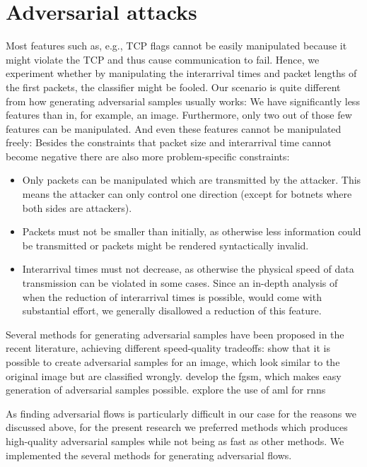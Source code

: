 \documentclass[conference]{IEEEtran}
\begin{document}
\section{Adversarial attacks}
\label{sec:adv}

Most features such as, e.g., TCP flags cannot be easily manipulated because it might violate the TCP and thus cause communication to fail. Hence, we experiment whether by manipulating the interarrival times and packet lengths of the first packets, the classifier might be fooled. Our scenario is quite different from how generating adversarial samples usually works: We have significantly less features than in, for example, an image. Furthermore, only two out of those few features can be manipulated. And even these features cannot be manipulated freely: Besides the constraints that packet size and interarrival time cannot become negative there are also more problem-specific constraints:
\begin{itemize}
\item Only packets can be manipulated which are transmitted by the attacker. This means the attacker can only control one direction (except for botnets where both sides are attackers).
\item Packets must not be smaller than initially, as otherwise less information could be transmitted or packets might be rendered syntactically invalid.
\item Interarrival times must not decrease, as otherwise the physical speed of data transmission can be violated in some cases. Since an in-depth analysis of when the reduction of interarrival times is possible, would come with substantial effort, we generally disallowed a reduction of this feature.
\end{itemize}

Several methods for generating adversarial samples have been proposed in the recent literature, achieving different speed-quality tradeoffs: 
\cite{szegedy_intriguing_2014} show that it is possible to create adversarial samples for an image, which look similar to the original image but are classified wrongly. \cite{goodfellow_explaining_2015} develop the \gls{fgsm}, which makes easy generation of adversarial samples possible. \cite{papernot_crafting_2016} explore the use of \gls{aml} for \glspl{rnn}

As finding adversarial flows is particularly difficult in our case for the reasons we discussed above, for the present research we preferred methods which produces high-quality adversarial samples while not being as fast as other methods. We implemented the several methods for generating adversarial flows.
\end{document}
